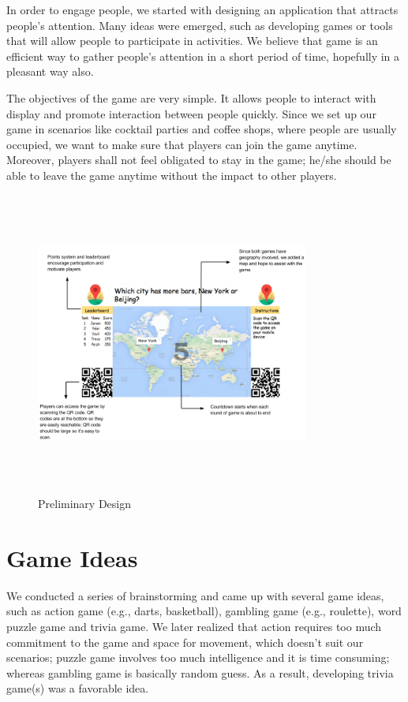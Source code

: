 \documentclass{sig-alternate}
\begin{document}
In order to engage people, we started with designing an application that attracts people's attention. Many ideas were emerged, such as developing games or tools that will allow people to participate in activities. We believe that game is an efficient way to gather people's attention in a short period of time, hopefully in a pleasant way also.

The objectives of the game are very simple. It allows people to interact with display and promote interaction between people quickly. Since we set up our game in scenarios like cocktail parties and coffee shops, where people are usually occupied, we want to make sure that players can join the game anytime. Moreover, players shall not feel obligated to stay in the game; he/she should be able to leave the game anytime without the impact to other players. 

\begin{figure}
	\centering
	\includegraphics[width=0.8\textwidth,height=10cm]{preliminary_design.png}
	\caption{Preliminary Design}
	\label{fig:pre_design}
\end{figure}

\section{Game Ideas}
We conducted a series of brainstorming and came up with several game ideas, such as action game (e.g., darts, basketball), gambling game (e.g., roulette), word puzzle game and trivia game. We later realized that action requires too much commitment to the game and space for movement, which doesn't suit our scenarios; puzzle game involves too much intelligence and it is time consuming; whereas gambling game is basically random guess. As a result, developing trivia game(s) was a favorable idea.
\end{document}
